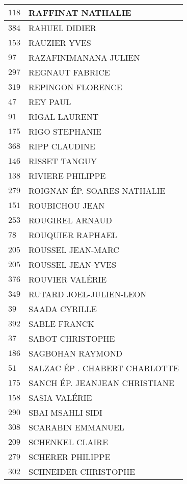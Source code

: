 \begin{xltabular}{\linewidth}{|l|X|}
    \hline
    $118$ & RAFFINAT NATHALIE \\
    \hline
    $384$ & RAHUEL DIDIER \\
    \hline
    $153$ & RAUZIER YVES \\
    \hline
    $97$ & RAZAFINIMANANA JULIEN \\
    \hline
    $297$ & REGNAUT FABRICE \\
    \hline
    $319$ & REPINGON FLORENCE \\
    \hline
    $47$ & REY PAUL \\
    \hline
    $91$ & RIGAL LAURENT \\
    \hline
    $175$ & RIGO STEPHANIE \\
    \hline
    $368$ & RIPP CLAUDINE \\
    \hline
    $146$ & RISSET TANGUY \\
    \hline
    $138$ & RIVIERE PHILIPPE \\
    \hline
    $279$ & ROIGNAN ÉP. SOARES NATHALIE \\
    \hline
    $151$ & ROUBICHOU JEAN \\
    \hline
    $253$ & ROUGIREL ARNAUD \\
    \hline
    $78$ & ROUQUIER RAPHAEL \\
    \hline
    $205$ & ROUSSEL JEAN-MARC \\
    \hline
    $205$ & ROUSSEL JEAN-YVES \\
    \hline
    $376$ & ROUVIER VALÉRIE \\
    \hline
    $349$ & RUTARD JOEL-JULIEN-LEON \\
    \hline
    $39$ & SAADA CYRILLE \\
    \hline
    $392$ & SABLE FRANCK \\
    \hline
    $37$ & SABOT CHRISTOPHE \\
    \hline
    $186$ & SAGBOHAN RAYMOND \\
    \hline
    $51$ & SALZAC ÉP . CHABERT CHARLOTTE \\
    \hline
    $175$ & SANCH ÉP. JEANJEAN CHRISTIANE \\
    \hline
    $158$ & SASIA VALÉRIE \\
    \hline
    $290$ & SBAI MSAHLI SIDI \\
    \hline
    $308$ & SCARABIN EMMANUEL \\
    \hline
    $209$ & SCHENKEL CLAIRE \\
    \hline
    $279$ & SCHERER PHILIPPE \\
    \hline
    $302$ & SCHNEIDER CHRISTOPHE \\

\end{xltabular}
